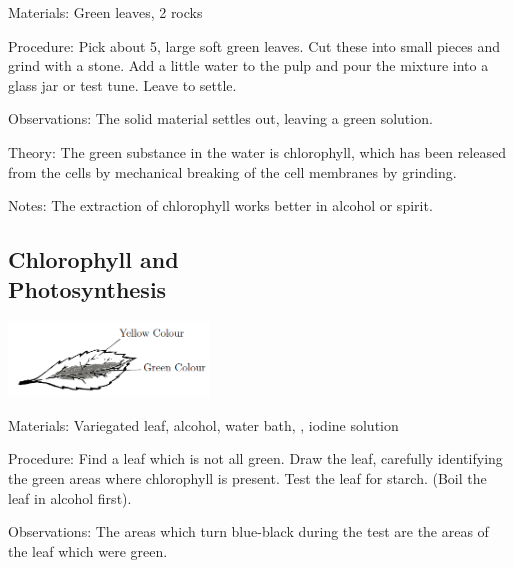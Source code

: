 \begin{multicols}{2}
\begin{description*}
\item[Materials:]{Green leaves, 2 rocks}
\item[Procedure:]{Pick about 5, large soft green leaves. Cut these into small pieces and grind with a stone.
Add a little water to the pulp and pour the mixture into a glass jar or test tune. Leave to settle.}
\item[Observations:]{The solid material settles out, leaving a green solution.}
\item[Theory:]{The green substance in the water is chlorophyll, which has been released from the cells by
mechanical breaking of the cell membranes by grinding.}
\item[Notes:]{The extraction of chlorophyll works better in alcohol or spirit.}
\end{description*}

\subsection{Chlorophyll and \hfill \\ Photosynthesis} %

\begin{center}
\includegraphics[width=0.4\textwidth]{./img/variegated-leaf.png}
\end{center}

\begin{description*}
\item[Materials:]{Variegated leaf, alcohol, water bath, , iodine solution}
\item[Procedure:]{Find a leaf which is not all green. Draw the
leaf, carefully identifying the
green areas where chlorophyll is
present. Test the leaf for starch.
(Boil the leaf in alcohol first).
}
\item[Observations:]{The areas which turn
blue-black during the test are the
areas of the leaf which were
green.}
\end{description*}


\end{multicols}
